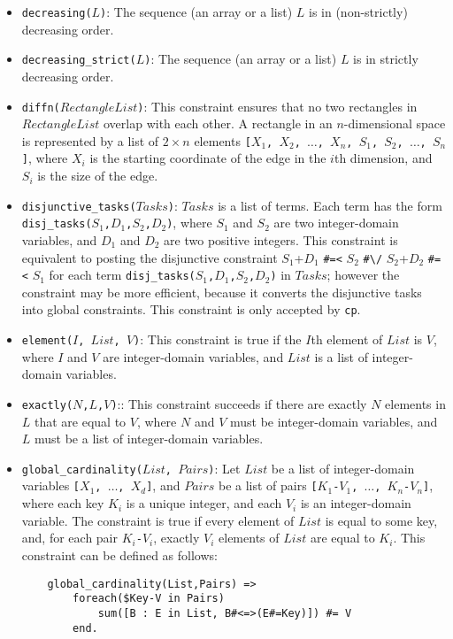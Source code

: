 \begin{itemize}
\item \texttt{decreasing($L$)}: The sequence (an array or a list) $L$ is in (non-strictly) decreasing order.

\item \texttt{decreasing\_strict($L$)}: The sequence (an array or a list) $L$ is in strictly decreasing order.

\item \texttt{diffn($RectangleList$)}: This constraint ensures that no two rectangles in $RectangleList$ overlap with each other. A rectangle in an $n$-dimensional space is represented by a list of $2\times n$ elements \texttt{[$X_1$, $X_2$, $\ldots$, $X_n$, $S_1$, $S_2$, $\ldots$, $S_n$]}, where \texttt{$X_i$} is the starting coordinate of the edge in the $i$th dimension, and \texttt{$S_i$} is the size of the edge.

\item \texttt{disjunctive\_tasks($Tasks$)}: $Tasks$ is a list of terms.  Each term has the form \\ \texttt{disj\_tasks($S_1$,$D_1$,$S_2$,$D_2$)}, where \texttt{$S_1$} and \texttt{$S_2$} are two integer-domain variables, and \texttt{$D_1$} and \texttt{$D_2$} are two positive integers. This constraint is equivalent to posting the disjunctive constraint $S_1$+$D_1$ \verb+#=<+ $S_2$ \verb+#\/+ $S_2$+$D_2$ \verb+#=<+ $S_1$ for each term \texttt{disj\_tasks($S_1$,$D_1$,$S_2$,$D_2$)} in $Tasks$; however the constraint may be more efficient, because it converts the disjunctive tasks into global constraints. This constraint is only accepted by \texttt{cp}.
\item \texttt{element($I$, $List$, $V$)}: This constraint is true if the $I$th element of $List$ is $V$, where $I$ and $V$ are integer-domain variables, and $List$ is a list of integer-domain variables.

\item \texttt{exactly($N$,$L$,$V$)}:: This constraint succeeds if there are exactly $N$ elements in $L$ that are equal to $V$, where $N$ and $V$ must be integer-domain variables, and $L$ must be a list of integer-domain variables.

\item \texttt{global\_cardinality($List$, $Pairs$)}: Let $List$ be a list of integer-domain variables \texttt{[$X_1$, $\ldots$, $X_d$]}, and $Pairs$ be a list of pairs \texttt{[$K_1$-$V_1$, $\ldots$, $K_n$-$V_n$]}, where each key \texttt{$K_i$} is a unique integer, and each \texttt{$V_i$} is an integer-domain variable. The constraint is true if every element of $List$ is equal to some key, and, for each pair \texttt{$K_i$-$V_i$}, exactly \texttt{$V_i$} elements of $List$ are equal to \texttt{$K_i$}. This constraint can be defined as follows:
\begin{verbatim}
    global_cardinality(List,Pairs) =>
        foreach($Key-V in Pairs) 
            sum([B : E in List, B#<=>(E#=Key)]) #= V
        end.
\end{verbatim}


\end{itemize}
